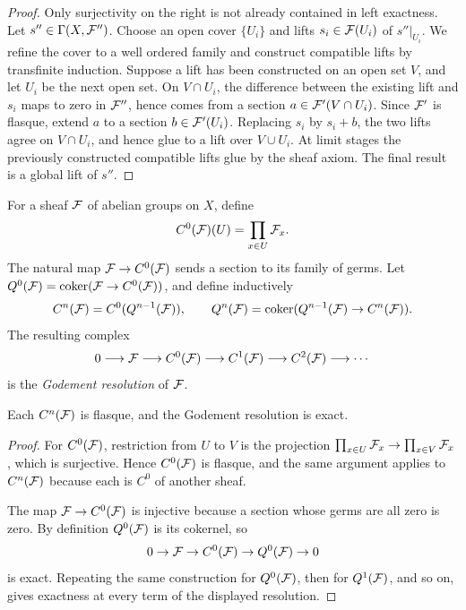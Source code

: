 \begin{proof}
Only surjectivity on the right is not already contained in left exactness.  Let
\(s''\in\Gamma(X,\mathcal{F}'')\).  Choose an open cover \(\{U_i\}\) and lifts
\(s_i\in\mathcal{F}(U_i)\) of \(s''|_{U_i}\).  We refine the cover to a well ordered
family and construct compatible lifts by transfinite induction.  Suppose a lift
has been constructed on an open set \(V\), and let \(U_i\) be the next open set.
On \(V\cap U_i\), the difference between the existing lift and \(s_i\) maps to
zero in \(\mathcal{F}''\), hence comes from a section \(a\in\mathcal{F}'(V\cap U_i)\).  Since
\(\mathcal{F}'\) is flasque, extend \(a\) to a section \(b\in\mathcal{F}'(U_i)\).  Replacing
\(s_i\) by \(s_i+b\), the two lifts agree on \(V\cap U_i\), and hence glue to a
lift over \(V\cup U_i\).  At limit stages the previously constructed compatible
lifts glue by the sheaf axiom.  The final result is a global lift of \(s''\).
\end{proof}

\begin{definition}
For a sheaf \(\mathcal{F}\) of abelian groups on \(X\), define
\[
    C^0(\mathcal{F})(U)=\prod_{x\in U}\mathcal{F}_x.
\]
The natural map \(\mathcal{F}\to C^0(\mathcal{F})\) sends a section to its family of germs.  Let
\(Q^0(\mathcal{F})=\operatorname{coker}(\mathcal{F}\to C^0(\mathcal{F}))\), and define inductively
\[
    C^n(\mathcal{F})=C^0(Q^{n-1}(\mathcal{F})),\qquad
    Q^n(\mathcal{F})=\operatorname{coker}(Q^{n-1}(\mathcal{F})\to C^n(\mathcal{F})).
\]
The resulting complex
\[
    0\longrightarrow \mathcal{F}\longrightarrow C^0(\mathcal{F})\longrightarrow C^1(\mathcal{F})
    \longrightarrow C^2(\mathcal{F})\longrightarrow\cdots
\]
is the \emph{Godement resolution} of \(\mathcal{F}\).
\end{definition}

\begin{proposition}
Each \(C^n(\mathcal{F})\) is flasque, and the Godement resolution is exact.
\end{proposition}

\begin{proof}
For \(C^0(\mathcal{F})\), restriction from \(U\) to \(V\) is the projection
\(\prod_{x\in U}\mathcal{F}_x\to\prod_{x\in V}\mathcal{F}_x\), which is surjective.  Hence
\(C^0(\mathcal{F})\) is flasque, and the same argument applies to \(C^n(\mathcal{F})\) because
each is \(C^0\) of another sheaf.

The map \(\mathcal{F}\to C^0(\mathcal{F})\) is injective because a section whose germs are all
zero is zero.  By definition \(Q^0(\mathcal{F})\) is its cokernel, so
\[
    0\to \mathcal{F}\to C^0(\mathcal{F})\to Q^0(\mathcal{F})\to 0
\]
is exact.  Repeating the same construction for \(Q^0(\mathcal{F})\), then for
\(Q^1(\mathcal{F})\), and so on, gives exactness at every term of the displayed
resolution.
\end{proof}

